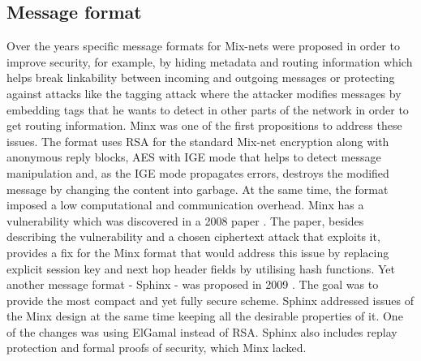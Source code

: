\subsection{Message format}
Over the years specific message formats for Mix-nets were proposed in order to improve security, for example, by hiding metadata and routing information which helps break linkability between incoming and outgoing messages or protecting against attacks like the tagging attack where the attacker modifies messages by embedding tags that he wants to detect in other parts of the network in order to get routing information. Minx \cite{minx} was one of the first propositions to address these issues. The format uses RSA for the standard Mix-net encryption along with anonymous reply blocks, AES with IGE mode that helps to detect message manipulation and, as the IGE mode propagates errors, destroys the modified message by changing the content into garbage. At the same time, the format imposed a low computational and communication overhead. Minx has a vulnerability which was discovered in a 2008 paper \cite{fix-minx}. The paper, besides describing the vulnerability and a chosen ciphertext attack that exploits it, provides a fix for the Minx format that would address this issue by replacing explicit session key and next hop header fields by utilising hash functions. 
Yet another message format - Sphinx - was proposed in 2009 \cite{sphinx}. The goal was to provide the most compact and yet fully secure scheme. Sphinx addressed issues of the Minx design at the same time keeping all the desirable properties of it. One of the changes was using ElGamal instead of RSA. Sphinx also includes replay protection and formal proofs of security, which Minx lacked.

